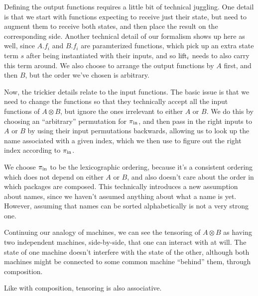 Defining the output functions requires a little bit of technical juggling.
One detail is that we start with functions expecting to receive
just their state, but need to augment them to receive both states,
and then place the result on the corresponding side.
Another technical detail of our formalism shows up here as well,
since $A.f_i$ and $B.f_i$ are paramterized functions, which pick up
an extra state term $s$ after being instantiated with their inputs,
and so $\text{lift}_i$ needs to also carry this term around.
We also choose to arrange the output functions by $A$ first,
and then $B$, but the order we've chosen is arbitrary.

Now, the trickier details relate to the input functions.
The basic issue is that we need to change the functions so that
they technically accept all the input functions of $A \otimes B$,
but ignore the ones irrelevant to either $A$ or $B$.
We do this by choosing an ``arbitrary'' permutation for $\pi_{\text{in}}$,
and then pass in the right inputs to $A$ or $B$ by using
their input permutations backwards, allowing us to look up the name
associated with a given index,
which we then use to figure out the right index according to $\pi_{\text{in}}$.

We choose $\pi_{\text{in}}$ to be the lexicographic ordering,
because it's a consistent ordering which does not depend
on either $A$ or $B$, and also doesn't care about the order in which
packages are composed.
This technically introduces a new assumption about names, since we
haven't assumed anything about what a name is yet.
However, assuming that names can be sorted alphabetically is not
a very strong one.

Continuing our analogy of machines, we can see the tensoring of $A \otimes B$
as having two independent machines, side-by-side, that one can interact
with at will.
The state of one machine doesn't interfere with the state of the other,
although both machines might be connected to some common machine ``behind''
them, through composition.

Like with composition, tensoring is also associative.


